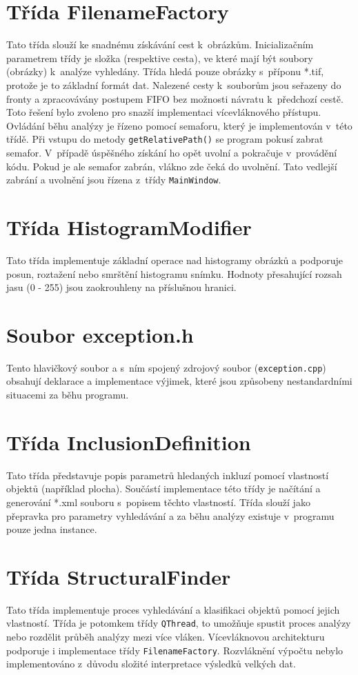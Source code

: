 \documentclass[12pt, a4paper]{report}
\begin{document}
\section{Třída FilenameFactory}
	Tato třída slouží ke snadnému získávání cest k~obrázkům. Inicializačním parametrem třídy je složka (respektive cesta), ve které mají být soubory (obrázky) k~analýze vyhledány. Třída hledá pouze obrázky s~příponu *.tif, protože je to základní formát dat. Nalezené cesty k~souborům jsou seřazeny do fronty a zpracovávány postupem FIFO bez možnosti návratu k~předchozí cestě. Toto řešení bylo zvoleno pro snazší implementaci vícevláknového přístupu. Ovládání běhu analýzy je řízeno pomocí semaforu, který je implementován v~této třídě. Při vstupu do metody \texttt{getRelativePath()} se program pokusí zabrat semafor. V~případě úspěšného získání ho opět uvolní a pokračuje v~provádění kódu. Pokud je ale semafor zabrán, vlákno zde čeká do uvolnění. Tato vedlejší zabrání a uvolnění jsou řízena z~třídy \texttt{MainWindow}.
	
\section{Třída HistogramModifier}
	Tato třída implementuje základní operace nad histogramy obrázků a podporuje posun, roztažení nebo smrštění histogramu snímku. Hodnoty přesahující rozsah jasu (0 - 255) jsou zaokrouhleny na příslušnou hranici.
	
\section{Soubor exception.h}
	Tento hlavičkový soubor a s~ním spojený zdrojový soubor (\texttt{exception.cpp}) obsahují deklarace a implementace výjimek, které jsou způsobeny nestandardními situacemi za běhu programu.  	
	
\section{Třída InclusionDefinition}
	Tato třída představuje popis parametrů hledaných inkluzí pomocí vlastností objektů (například plocha). Součástí implementace této třídy je načítání a generování *.xml souboru s~popisem těchto vlastností. Třída slouží jako přepravka pro parametry vyhledávání a za běhu analýzy existuje v~programu pouze jedna instance. 	
	
\section{Třída StructuralFinder}	
	Tato třída implementuje proces vyhledávání a klasifikaci objektů pomocí jejich vlastností. Třída je potomkem třídy \texttt{QThread}, to umožňuje spustit proces analýzy  nebo rozdělit průběh analýzy mezi více vláken. Vícevláknovou architekturu podporuje i implementace třídy \texttt{FilenameFactory}. Rozvláknění výpočtu nebylo implementováno z~důvodu složité interpretace výsledků velkých dat.
\end{document}
